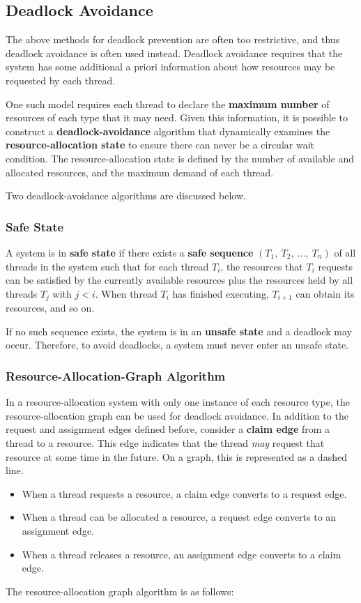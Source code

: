 \documentclass{article}
\begin{document}
\subsection{Deadlock Avoidance}
The above methods for deadlock prevention are often too restrictive,
and thus deadlock avoidance is often used instead. Deadlock avoidance
requires that the system has some additional a priori information about
how resources may be requested by each thread.

One such model requires each thread to declare the \textbf{maximum
number} of resources of each type that it may need. Given this
information, it is possible to construct a \textbf{deadlock-avoidance}
algorithm that dynamically examines the \textbf{resource-allocation
state} to ensure there can never be a circular wait condition. The
resource-allocation state is defined by the number of available and
allocated resources, and the maximum demand of each thread.

Two deadlock-avoidance algorithms are discussed below.
\subsubsection{Safe State}
A system is in \textbf{safe state} if there exists a \textbf{safe
sequence} \(\left( T_1,\: T_2,\: \ldots,\: T_n \right)\) of all threads
in the system such that for each thread \(T_i\), the resources that
\(T_i\) requests can be satisfied by the currently available resources
plus the resources held by all threads \(T_j\) with \(j < i\). When
thread \(T_i\) has finished executing, \(T_{i+1}\) can obtain its
resources, and so on.

If no such sequence exists, the system is in an \textbf{unsafe state}
and a deadlock may occur. Therefore, to avoid deadlocks, a system must
never enter an unsafe state.
\subsubsection{Resource-Allocation-Graph Algorithm}
In a resource-allocation system with only one instance of each resource
type, the resource-allocation graph can be used for deadlock avoidance.
In addition to the request and assignment edges defined before,
consider a \textbf{claim edge} from a thread to a resource. This edge
indicates that the thread \textit{may} request that resource at some
time in the future. On a graph, this is represented as a dashed line.
\begin{itemize}
    \item When a thread requests a resource, a claim edge converts to a
          request edge.
    \item When a thread can be allocated a resource, a request edge
          converts to an assignment edge.
    \item When a thread releases a resource, an assignment edge
          converts to a claim edge.
\end{itemize}
The resource-allocation graph algorithm is as follows:
\end{document}
